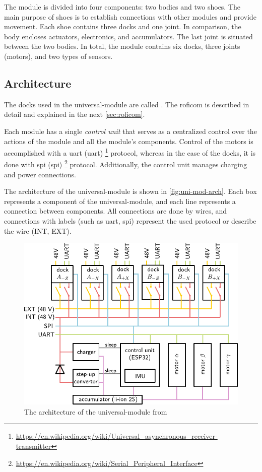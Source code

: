 \documentclass[
  digital,     %
  oneside,     %
  nosansbold,  %
  nocolorbold, %
  nolof,         %
  nolot,         %
]{fithesis4}
\begin{document}
The module is divided into four components: two bodies and two shoes. The main purpose of shoes is
to establish connections with other modules and provide movement. Each shoe contains three docks and
one joint. In comparison, the body encloses actuators, electronics, and accumulators. The last joint
is situated between the two bodies. In total, the module contains six docks, three joints (motors),
and two types of sensors.

\subsection{ Architecture }

The docks used in the \gls{universal-module} are called . The \acrshort{roficom}
is described in detail and explained in the next \autoref{sec:roficom}.

Each module has a single \emph{control unit} that serves as a centralized control over the actions
of the module and all the module's components. Control of the motors is accomplished with a
\acrshort{uart} (\acrlong{uart})
\footnote{\url{https://en.wikipedia.org/wiki/Universal_asynchronous_receiver-transmitter}} protocol,
whereas in the case of the docks, it is done with \acrshort{spi} (\acrlong{spi})
\footnote{\url{https://en.wikipedia.org/wiki/Serial_Peripheral_Interface}} protocol. Additionally,
the control unit manages charging and power connections.

The architecture of the \gls{universal-module} is shown in \autoref{fig:uni-mod-arch}. Each box
represents a component of the \gls{universal-module}, and each line represents a connection between
components. All connections are done by wires, and connections with labels (such as \acrshort{uart},
\acrshort{spi}) represent the used protocol or describe the wire (INT, EXT). 

\begin{figure}[ht]
    \includegraphics{ assets/universal-module-arch.pdf }
    \caption{The architecture of the \gls{universal-module} from \cite[p.~35]{Mrazek2019thesis}}
    \label{fig:uni-mod-arch}
\end{figure}
\end{document}
